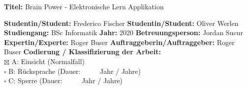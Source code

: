 

\textbf{Titel:} Brain Power - Elektronische Lern Applikation\\ \vspace*{0.2cm}

\noindent
\textbf{Studentin/Student:} Frederico Fischer\newline \newline
\textbf{Studentin/Student:} Oliver Werlen\newline \newline
\textbf{Studiengang:} BSc Informatik  \newline \newline
\textbf{Jahr: } 2020\newline \newline
\textbf{Betreuungsperson:} Jordan Sucur\newline \newline
\textbf{Expertin/Experte:} Roger Buser\newline \newline
\textbf{Auftraggeberin/Auftraggeber:} Roger Buser\newline \newline \newline
\textbf{Codierung / Klassifizierung der Arbeit:}\\
$\boxtimes$ A: Einsicht 	(Normalfall) \\
$\square$ B: R\"ucksprache	(Dauer: \ \ \ \ \        Jahr / Jahre)\\
$\square$ C: Sperre	(Dauer: \ \ \ \ \        Jahr / Jahre)\\




